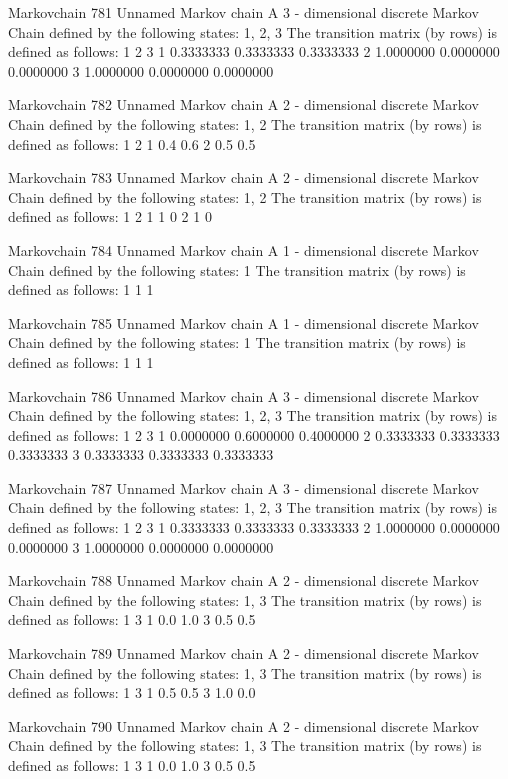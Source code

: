 \documentclass[
  nojss]{jss}
\begin{document}
\begin{CodeChunk}
\begin{CodeOutput}
Markovchain  781 
Unnamed Markov chain 
 A  3 - dimensional discrete Markov Chain defined by the following states: 
 1, 2, 3 
 The transition matrix  (by rows)  is defined as follows: 
          1         2         3
1 0.3333333 0.3333333 0.3333333
2 1.0000000 0.0000000 0.0000000
3 1.0000000 0.0000000 0.0000000

Markovchain  782 
Unnamed Markov chain 
 A  2 - dimensional discrete Markov Chain defined by the following states: 
 1, 2 
 The transition matrix  (by rows)  is defined as follows: 
    1   2
1 0.4 0.6
2 0.5 0.5

Markovchain  783 
Unnamed Markov chain 
 A  2 - dimensional discrete Markov Chain defined by the following states: 
 1, 2 
 The transition matrix  (by rows)  is defined as follows: 
  1 2
1 1 0
2 1 0

Markovchain  784 
Unnamed Markov chain 
 A  1 - dimensional discrete Markov Chain defined by the following states: 
 1 
 The transition matrix  (by rows)  is defined as follows: 
  1
1 1

Markovchain  785 
Unnamed Markov chain 
 A  1 - dimensional discrete Markov Chain defined by the following states: 
 1 
 The transition matrix  (by rows)  is defined as follows: 
  1
1 1

Markovchain  786 
Unnamed Markov chain 
 A  3 - dimensional discrete Markov Chain defined by the following states: 
 1, 2, 3 
 The transition matrix  (by rows)  is defined as follows: 
          1         2         3
1 0.0000000 0.6000000 0.4000000
2 0.3333333 0.3333333 0.3333333
3 0.3333333 0.3333333 0.3333333

Markovchain  787 
Unnamed Markov chain 
 A  3 - dimensional discrete Markov Chain defined by the following states: 
 1, 2, 3 
 The transition matrix  (by rows)  is defined as follows: 
          1         2         3
1 0.3333333 0.3333333 0.3333333
2 1.0000000 0.0000000 0.0000000
3 1.0000000 0.0000000 0.0000000

Markovchain  788 
Unnamed Markov chain 
 A  2 - dimensional discrete Markov Chain defined by the following states: 
 1, 3 
 The transition matrix  (by rows)  is defined as follows: 
    1   3
1 0.0 1.0
3 0.5 0.5

Markovchain  789 
Unnamed Markov chain 
 A  2 - dimensional discrete Markov Chain defined by the following states: 
 1, 3 
 The transition matrix  (by rows)  is defined as follows: 
    1   3
1 0.5 0.5
3 1.0 0.0

Markovchain  790 
Unnamed Markov chain 
 A  2 - dimensional discrete Markov Chain defined by the following states: 
 1, 3 
 The transition matrix  (by rows)  is defined as follows: 
    1   3
1 0.0 1.0
3 0.5 0.5


\end{CodeOutput}
\end{CodeChunk}
\end{document}

